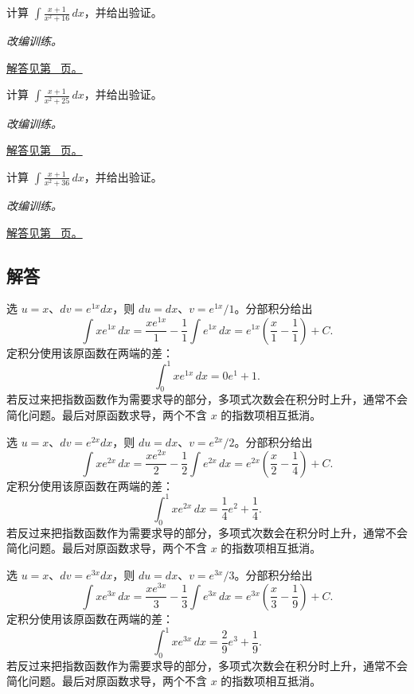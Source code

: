 \documentclass[12pt,fontset=fandol]{ctexart}
\begin{document}
\begin{example}[不可约二次因子的积分]\label{ex:c13q22}
计算 $\displaystyle\int\frac{x+1}{x^2+16}\,dx$，并给出验证。
\par\textit{改编训练。}\par\hyperref[ans:c13q22]{解答见第~\pageref{ans:c13q22} 页。}
\end{example}
\begin{example}[不可约二次因子的积分]\label{ex:c13q23}
计算 $\displaystyle\int\frac{x+1}{x^2+25}\,dx$，并给出验证。
\par\textit{改编训练。}\par\hyperref[ans:c13q23]{解答见第~\pageref{ans:c13q23} 页。}
\end{example}
\begin{example}[不可约二次因子的积分]\label{ex:c13q24}
计算 $\displaystyle\int\frac{x+1}{x^2+36}\,dx$，并给出验证。
\par\textit{改编训练。}\par\hyperref[ans:c13q24]{解答见第~\pageref{ans:c13q24} 页。}
\end{example}
\subsection{解答}
\begin{solve}\label{ans:c13q1}
选 $u=x$、$dv=e^{1x}dx$，则 $du=dx$、$v=e^{1x}/1$。分部积分给出
\[
\int xe^{1x}\,dx=\frac{xe^{1x}}{1}-\frac1{1}\int e^{1x}\,dx=e^{1x}\left(\frac x{1}-\frac1{1}\right)+C.
\]
定积分使用该原函数在两端的差：
\[
\int_0^1xe^{1x}\,dx=0e^{1}+1.
\]
若反过来把指数函数作为需要求导的部分，多项式次数会在积分时上升，通常不会简化问题。最后对原函数求导，两个不含 $x$ 的指数项相互抵消。
\end{solve}

\begin{solve}\label{ans:c13q2}
选 $u=x$、$dv=e^{2x}dx$，则 $du=dx$、$v=e^{2x}/2$。分部积分给出
\[
\int xe^{2x}\,dx=\frac{xe^{2x}}{2}-\frac1{2}\int e^{2x}\,dx=e^{2x}\left(\frac x{2}-\frac1{4}\right)+C.
\]
定积分使用该原函数在两端的差：
\[
\int_0^1xe^{2x}\,dx=\frac{1}{4}e^{2}+\frac{1}{4}.
\]
若反过来把指数函数作为需要求导的部分，多项式次数会在积分时上升，通常不会简化问题。最后对原函数求导，两个不含 $x$ 的指数项相互抵消。
\end{solve}

\begin{solve}\label{ans:c13q3}
选 $u=x$、$dv=e^{3x}dx$，则 $du=dx$、$v=e^{3x}/3$。分部积分给出
\[
\int xe^{3x}\,dx=\frac{xe^{3x}}{3}-\frac1{3}\int e^{3x}\,dx=e^{3x}\left(\frac x{3}-\frac1{9}\right)+C.
\]
定积分使用该原函数在两端的差：
\[
\int_0^1xe^{3x}\,dx=\frac{2}{9}e^{3}+\frac{1}{9}.
\]
若反过来把指数函数作为需要求导的部分，多项式次数会在积分时上升，通常不会简化问题。最后对原函数求导，两个不含 $x$ 的指数项相互抵消。
\end{solve}
\end{document}
